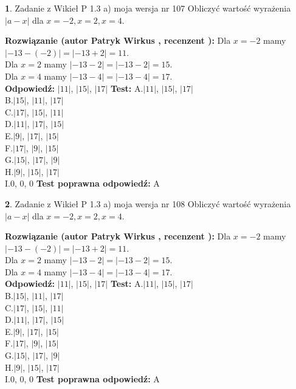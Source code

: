 \documentclass[12pt, a4paper]{article}
\theoremstyle{definition} %
\newtheorem{zad}{}
\newcommand{\zadStart}[1]{\begin{zad}#1\newline}
\newcommand{\zadStop}{\end{zad}}
\newcommand{\rozwStart}[2]{\noindent \textbf{Rozwiązanie (autor #1 , recenzent #2): }\newline}
\newcommand{\rozwStop}{\newline}
\newcommand{\odpStart}{\noindent \textbf{Odpowiedź:}\newline}
\newcommand{\odpStop}{\newline}
\newcommand{\testStart}{\noindent \textbf{Test:}\newline}
\newcommand{\testStop}{\newline}
\newcommand{\kluczStart}{\noindent \textbf{Test poprawna odpowiedź:}\newline}
\newcommand{\kluczStop}{\newline}
\begin{document}
\zadStart{Zadanie z Wikieł P 1.3 a) moja wersja nr 107}
Obliczyć wartość wyrażenia $|a - x|$ dla $x=-2,x=2,x=4$.
\zadStop
\rozwStart{Patryk Wirkus}{}
Dla $x = -2$ mamy $|-13 - (-2)| = |-13 + 2| = 11$.\\
Dla $x = 2$ mamy $|-13 - 2| = |-13 - 2| = 15$.\\
Dla $x = 4$ mamy $|-13 - 4| = |-13 - 4| = 17$.\\
\rozwStop
\odpStart
$|11|$, $|15|$, $|17|$
\odpStop
\testStart
A.$|11|$, $|15|$, $|17|$\\
B.$|15|$, $|11|$, $|17|$\\
C.$|17|$, $|15|$, $|11|$\\
D.$|11|$, $|17|$, $|15|$\\
E.$|9|$, $|17|$, $|15|$\\
F.$|17|$, $|9|$, $|15|$\\
G.$|15|$, $|17|$, $|9|$\\
H.$|9|$, $|15|$, $|17|$\\
I.$0$, $0$, $0$
\testStop
\kluczStart
A
\kluczStop



\zadStart{Zadanie z Wikieł P 1.3 a) moja wersja nr 108}
Obliczyć wartość wyrażenia $|a - x|$ dla $x=-2,x=2,x=4$.
\zadStop
\rozwStart{Patryk Wirkus}{}
Dla $x = -2$ mamy $|-13 - (-2)| = |-13 + 2| = 11$.\\
Dla $x = 2$ mamy $|-13 - 2| = |-13 - 2| = 15$.\\
Dla $x = 4$ mamy $|-13 - 4| = |-13 - 4| = 17$.\\
\rozwStop
\odpStart
$|11|$, $|15|$, $|17|$
\odpStop
\testStart
A.$|11|$, $|15|$, $|17|$\\
B.$|15|$, $|11|$, $|17|$\\
C.$|17|$, $|15|$, $|11|$\\
D.$|11|$, $|17|$, $|15|$\\
E.$|9|$, $|17|$, $|15|$\\
F.$|17|$, $|9|$, $|15|$\\
G.$|15|$, $|17|$, $|9|$\\
H.$|9|$, $|15|$, $|17|$\\
I.$0$, $0$, $0$
\testStop
\kluczStart
A
\kluczStop
\end{document}
